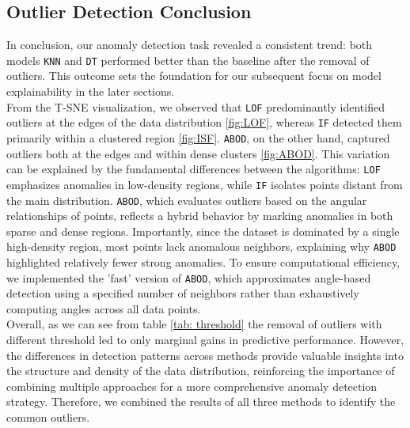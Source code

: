 \subsection{Outlier Detection Conclusion}
In conclusion, our anomaly detection task revealed a consistent trend: both models \texttt{KNN} and \texttt{DT} performed better than the 
baseline after the removal of outliers. This outcome sets the foundation for our subsequent focus on model 
explainability in the later sections.\\ 
From the T-SNE visualization, we observed that \texttt{LOF} predominantly 
identified outliers at the edges of the data distribution \ref{fig:LOF}, whereas \texttt{IF} detected 
them primarily within a clustered region \ref{fig:ISF}. \texttt{ABOD}, on the other hand, captured outliers both at 
the edges and within dense clusters \ref{fig:ABOD}. This variation can be explained by the fundamental 
differences between the algorithms: \texttt{LOF} emphasizes anomalies in low-density regions, 
while \texttt{IF} isolates points distant from the main distribution. 
\texttt{ABOD}, which evaluates outliers based on the angular relationships of points, reflects a hybrid behavior by 
marking anomalies in both sparse and dense regions. Importantly, since the dataset is dominated by a 
single high-density region, most points lack anomalous neighbors, explaining why \texttt{ABOD} highlighted relatively 
fewer strong anomalies. To ensure computational efficiency, we implemented the 'fast' version of \texttt{ABOD}, 
which approximates angle-based detection using a specified number of neighbors rather than exhaustively 
computing angles across all data points. \\
Overall, as we can see from table \ref{tab: threshold} the removal of outliers with different threshold led to only marginal gains in predictive performance.
However, the differences in detection patterns across methods provide valuable insights into the structure and density 
of the data distribution, reinforcing the importance of combining multiple approaches for a more 
comprehensive anomaly detection strategy. Therefore, we combined the results of all three methods to identify the common outliers.


